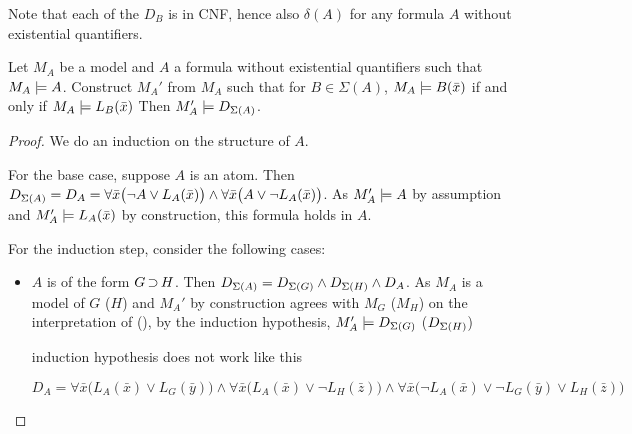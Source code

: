 Note that each of the $D_B$ is in CNF, hence also $\delta(A)$ for any formula $A$ without existential quantifiers.

\begin{lemma}
	Let $M_A$ be a model and $A$ a formula without existential quantifiers such that $M_A \models A$.
	Construct $M_A'$ from $M_A$ such that for $B\in\Sigma(A)$, $M_A\models B(\bar x)$ if and only if $M_A \models L_B(\bar x)$
	Then $M_A' \models D_{\Sigma(A)}$.
\end{lemma}
\begin{proof}
	We do an induction on the structure of $A$.

	For the base case, suppose $A$ is an atom. 
	Then $D_{\Sigma(A)} = D_A  =\allowbreak \forall \bar x \big(\lnot A \lor L_A(\bar x)\big) \land\allowbreak \forall \bar x \big(A \lor \lnot L_A(\bar x)\big)$. 
	As $M_A' \models A$ by assumption and $M_A'\models L_A(\bar x)$ by construction, this formula holds in $A$.

	For the induction step, consider the following cases:
	\begin{itemize}
		\item $A$ is of the form $G \operatorname{\supset} H$. 
			Then $D_{\Sigma(A)} =
			D_{\Sigma(G)} \land
			D_{\Sigma(H)} \land D_A$.
			As $M_A$ is a model of $G$ ($H$) and $M_A'$ by construction agrees with $M_G$ ($M_H$) on the interpretation of  (),
			by the induction hypothesis, $M_A' \models D_{\Sigma(G)}$  ($D_{\Sigma(H)}$) 
			{

				\huge

				induction hypothesis does not work like this

			}

			$D_A =
		 \forall \bar x \big(L_A(\bar x) \lor L_G(\bar y)\big) \land
		\forall \bar x \big(L_A(\bar x) \lor \lnot L_H(\bar z)\big) \land \forall \bar x \big(\lnot L_A(\bar x) \lor \lnot L_G(\bar y) \lor L_H(\bar z)\big)  $
			
	\end{itemize}

\end{proof}

